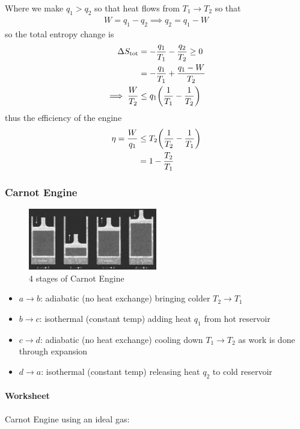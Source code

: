 \documentclass[../main.tex]{subfiles}
\begin{document}
Where we make $q_1 > q_2$ so that heat flows from $T_1 \to T_2$ so that
\begin{align*}
    W = q_1 - q_2 \implies q_2 = q_1 - W
\end{align*}
so the total entropy change is
\begin{align*}
    \Delta S_\text{tot} &= -\frac{q_1}{T_1} - \frac{q_2}{T_2} \geq 0 \\
    &= -\frac{q_1}{T_1} + \frac{q_1 - W}{T_2} \\
    \implies \frac{W}{T_2} &\leq q_1 \qt(\frac{1}{T_1} - \frac{1}{T_2})
\end{align*}
thus the efficiency of the engine
\begin{align*}
    \eta = \frac{W}{q_1} &\leq  T_2 \qt(\frac{1}{T_2} - \frac{1}{T_1}) \\
    &= 1 - \frac{T_2}{T_1}
\end{align*}

\subsubsection*{Carnot Engine} 

\begin{figure}[ht]
    \centering
    \includegraphics[width=0.5\textwidth]{fig5_4.png}
    \caption{4 stages of Carnot Engine}
    \label{fig:5_4}
\end{figure}

\begin{itemize}
    \item $a \to b$: adiabatic (no heat exchange) bringing colder $T_2 \to T_1$
    \item $b \to c$: isothermal (constant temp) adding heat $q_1$ from hot reservoir
    \item $c \to d$: adiabatic (no heat exchange) cooling down $T_1 \to T_2$ as work is done through expansion
    \item $d \to a$: isothermal (constant temp) releasing heat $q_2$ to cold reservoir
\end{itemize}

\paragraph{Worksheet} Carnot Engine using an ideal gas:
\end{document}
